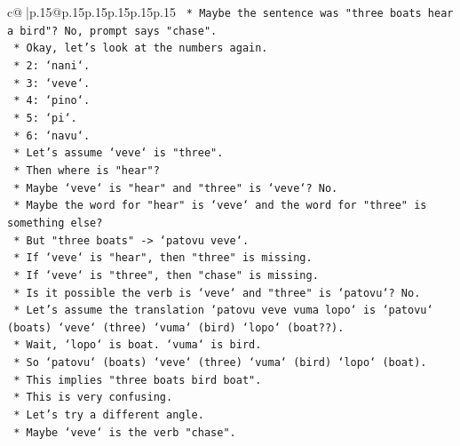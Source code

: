 \documentclass{article}
\begin{document}
{\begin{supertabular}{c@{$\;$}|p{.15\linewidth}@{}p{.15\linewidth}p{.15\linewidth}p{.15\linewidth}p{.15\linewidth}p{.15\linewidth}}
{{{\texttt{                        *   Maybe the sentence was "three boats hear a bird"? No, prompt says "chase".} \\
\texttt{                        *   Okay, let's look at the numbers again.} \\
\texttt{                        *   2: `nani`.} \\
\texttt{                        *   3: `veve`.} \\
\texttt{                        *   4: `pino`.} \\
\texttt{                        *   5: `pi`.} \\
\texttt{                        *   6: `navu`.} \\
\texttt{                        *   Let's assume `veve` is "three".} \\
\texttt{                        *   Then where is "hear"?} \\
\texttt{                        *   Maybe `veve` is "hear" and "three" is `veve`? No.} \\
\texttt{                        *   Maybe the word for "hear" is `veve` and the word for "three" is something else?} \\
\texttt{                        *   But "three boats" {-}> `patovu veve`.} \\
\texttt{                        *   If `veve` is "hear", then "three" is missing.} \\
\texttt{                        *   If `veve` is "three", then "chase" is missing.} \\
\texttt{                        *   Is it possible the verb is `veve` and "three" is `patovu`? No.} \\
\texttt{                        *   Let's assume the translation `patovu veve vuma lopo` is `patovu` (boats) `veve` (three) `vuma` (bird) `lopo` (boat??).} \\
\texttt{                        *   Wait, `lopo` is boat. `vuma` is bird.} \\
\texttt{                        *   So `patovu` (boats) `veve` (three) `vuma` (bird) `lopo` (boat).} \\
\texttt{                        *   This implies "three boats bird boat".} \\
\texttt{                        *   This is very confusing.} \\
\texttt{                        *   Let's try a different angle.} \\
\texttt{                        *   Maybe `veve` is the verb "chase".} \\
}}}
\end{supertabular}}
\end{document}

